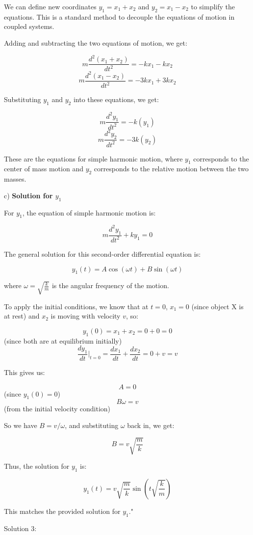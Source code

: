 We can define new coordinates \( y_1 = x_1 + x_2 \) and \( y_2 = x_1 - x_2 \) to simplify the equations. This is a standard method to decouple the equations of motion in coupled systems.

Adding and subtracting the two equations of motion, we get:

\[ m \frac{d^2 (x_1 + x_2)}{dt^2} = -kx_1 - kx_2 \]
\[ m \frac{d^2 (x_1 - x_2)}{dt^2} = -3kx_1 + 3kx_2 \]

Substituting \( y_1 \) and \( y_2 \) into these equations, we get:

\[ m \frac{d^2 y_1}{dt^2} = -k(y_1) \]
\[ m \frac{d^2 y_2}{dt^2} = -3k(y_2) \]

These are the equations for simple harmonic motion, where \( y_1 \) corresponds to the center of mass motion and \( y_2 \) corresponds to the relative motion between the two masses.

c) \textbf{Solution for \( y_1 \)}

For \( y_1 \), the equation of simple harmonic motion is:

\[ m \frac{d^2 y_1}{dt^2} + ky_1 = 0 \]

The general solution for this second-order differential equation is:

\[ y_1(t) = A \cos(\omega t) + B \sin(\omega t) \]

where \( \omega = \sqrt{\frac{k}{m}} \) is the angular frequency of the motion.

To apply the initial conditions, we know that at \( t = 0 \), \( x_1 = 0 \) (since object X is at rest) and \( x_2 \) is moving with velocity \( v \), so:

\[ y_1(0) = x_1 + x_2 = 0 + 0 = 0 \] (since both are at equilibrium initially)
\[ \frac{dy_1}{dt}\Big|_{t=0} = \frac{dx_1}{dt} + \frac{dx_2}{dt} = 0 + v = v \]

This gives us:

\[ A = 0 \] (since \( y_1(0) = 0 \))
\[ B\omega = v \] (from the initial velocity condition)

So we have \( B = v / \omega \), and substituting \( \omega \) back in, we get:

\[ B = v \sqrt{\frac{m}{k}} \]

Thus, the solution for \( y_1 \) is:

\[ y_1(t) = v \sqrt{\frac{m}{k}} \sin(t \sqrt{\frac{k}{m}}) \]

This matches the provided solution for \( y_1 \)."

Solution 3:

